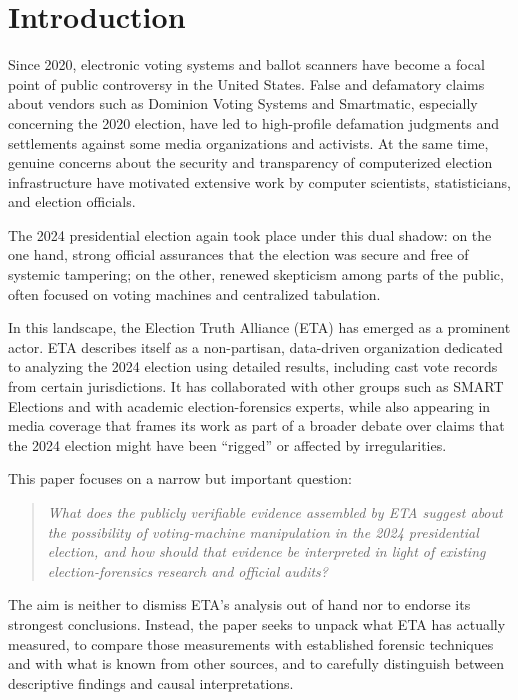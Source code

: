 \documentclass[12pt]{article}
\begin{document}
\section{Introduction}

Since 2020, electronic voting systems and ballot scanners have become a focal point of public controversy in the United States. False and defamatory claims about vendors such as Dominion Voting Systems and Smartmatic, especially concerning the 2020 election, have led to high-profile defamation judgments and settlements against some media organizations and activists. At the same time, genuine concerns about the security and transparency of computerized election infrastructure have motivated extensive work by computer scientists, statisticians, and election officials.

The 2024 presidential election again took place under this dual shadow: on the one hand, strong official assurances that the election was secure and free of systemic tampering; on the other, renewed skepticism among parts of the public, often focused on voting machines and centralized tabulation.

In this landscape, the Election Truth Alliance (ETA) has emerged as a prominent actor. ETA describes itself as a non-partisan, data-driven organization dedicated to analyzing the 2024 election using detailed results, including cast vote records from certain jurisdictions. It has collaborated with other groups such as SMART Elections and with academic election-forensics experts, while also appearing in media coverage that frames its work as part of a broader debate over claims that the 2024 election might have been ``rigged'' or affected by irregularities.

This paper focuses on a narrow but important question: 

\begin{quote}
\emph{What does the publicly verifiable evidence assembled by ETA suggest about the possibility of voting-machine manipulation in the 2024 presidential election, and how should that evidence be interpreted in light of existing election-forensics research and official audits?}
\end{quote}

The aim is neither to dismiss ETA's analysis out of hand nor to endorse its strongest conclusions. Instead, the paper seeks to unpack what ETA has actually measured, to compare those measurements with established forensic techniques and with what is known from other sources, and to carefully distinguish between descriptive findings and causal interpretations.
\end{document}
